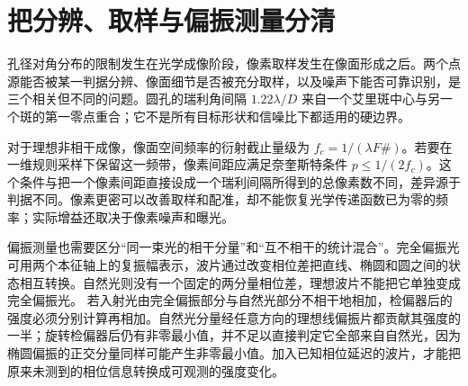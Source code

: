 \section{把分辨、取样与偏振测量分清}
孔径对角分布的限制发生在光学成像阶段，像素取样发生在像面形成之后。两个点源能否被某一判据分辨、像面细节是否被充分取样，以及噪声下能否可靠识别，是三个相关但不同的问题。圆孔的瑞利角间隔 $1.22\lambda/D$ 来自一个艾里斑中心与另一个斑的第一零点重合；它不是所有目标形状和信噪比下都适用的硬边界。

对于理想非相干成像，像面空间频率的衍射截止量级为 $f_c=1/(\lambda F\#)$。若要在一维规则采样下保留这一频带，像素间距应满足奈奎斯特条件 $p\le1/(2f_c)$。这个条件与把一个像素间距直接设成一个瑞利间隔所得到的总像素数不同，差异源于判据不同。像素更密可以改善取样和配准，却不能恢复光学传递函数已为零的频率；实际增益还取决于像素噪声和曝光。

偏振测量也需要区分“同一束光的相干分量”和“互不相干的统计混合”。完全偏振光可用两个本征轴上的复振幅表示，波片通过改变相位差把直线、椭圆和圆之间的状态相互转换。自然光则没有一个固定的两分量相位差，理想波片不能把它单独变成完全偏振光。
若入射光由完全偏振部分与自然光部分不相干地相加，检偏器后的强度必须分别计算再相加。自然光分量经任意方向的理想线偏振片都贡献其强度的一半；旋转检偏器后仍有非零最小值，并不足以直接判定它全部来自自然光，因为椭圆偏振的正交分量同样可能产生非零最小值。加入已知相位延迟的波片，才能把原来未测到的相位信息转换成可观测的强度变化。
